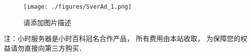 
\begin{issues}
\issueDraft
\end{issues}

\begin{figure}[ht]
\centering
\texttt{[image: ./figures/SverAd\_1.png]}
\caption{请添加图片描述} \label{SverAd_fig1}
\end{figure}

注：小时服务器是小时百科冠名合作产品， 所有费用由本站收取， 为保障您的权益请勿直接向第三方购买．
